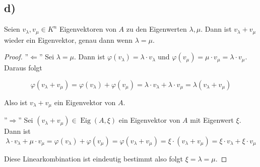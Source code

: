 \documentclass{article}
\DeclareMathOperator{\eigenraum}{Eig}
\begin{document}
\subsection*{d)}

Seien
$v_{\lambda}, v_{\mu} \in K^n$
Eigenvektoren von $A$ zu den Eigenwerten
$\lambda, \mu$.
Dann ist
$v_{\lambda} + v_{\mu}$
wieder ein Eigenvektor, genau dann
wenn $\lambda = \mu$.

\begin{proof}
  ''$\Leftarrow$''
  Sei $\lambda = \mu$.
  Dann ist $\varphi (v_{\lambda}) = \lambda \cdot v_{\lambda}$
  und $\varphi (v_{\mu}) = \mu \cdot v_{\mu} = \lambda \cdot v_{\mu}$.
  Daraus folgt

  \[
    \varphi (v_{\lambda} + v_{\mu})
    =
    \varphi (v_{\lambda}) + \varphi (v_{\mu})
    =
    \lambda \cdot v_{\lambda} + \lambda \cdot v_{\mu}
    =
    \lambda (v_{\lambda} + v_{\mu})
  \]

  Also ist $v_{\lambda} + v_{\mu}$ ein Eigenvektor von $A$.

  \bigbreak

  ''$\Rightarrow$''
  Sei $(v_{\lambda} + v_{\mu}) \in \eigenraum (A, \xi)$
  ein Eigenvektor von $A$ mit Eigenwert $\xi$.
  Dann ist
  \[
    \lambda \cdot v_{\lambda} + \mu \cdot v_{\mu}
    =
    \varphi (v_{\lambda}) + \varphi (v_{\mu})
    =
    \varphi(v_{\lambda} + v_{\mu})
    =
    \xi \cdot (v_{\lambda} + v_{\mu})
    =
    \xi \cdot v_{\lambda} + \xi \cdot v_{\mu}
  \]

  Diese Linearkombination ist eindeutig bestimmt
  also folgt $\xi = \lambda = \mu$.

\end{proof}
\end{document}
